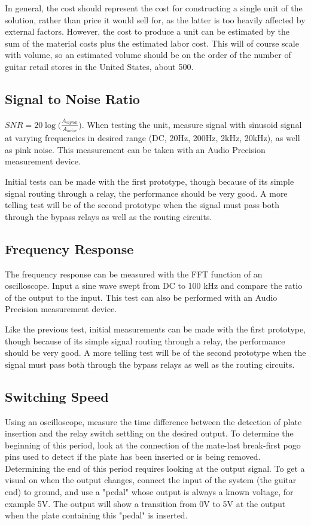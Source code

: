 \documentclass{article}
\begin{document}
	In general, the cost should represent the cost for constructing a single unit of the solution, rather than price it would sell for, as the latter is too heavily affected by external factors.  However, the cost to produce a unit can be estimated by the sum of the material costs plus the estimated labor cost.  This will of course scale with volume, so an estimated volume should be on the order of the number of guitar retail stores in the United States, about 500.

	\subsection{Signal to Noise Ratio}
	$SNR = 20 \log \big( \frac{A_{signal}}{A_{noise}} \big)$.  When testing the unit, measure signal with sinusoid signal at varying frequencies in desired range (DC, 20Hz, 200Hz, 2kHz, 20kHz), as well as pink noise.  This measurement can be taken with an Audio Precision measurement device.

	Initial tests can be made with the first prototype, though because of its simple signal routing through a relay, the performance should be very good.  A more telling test will be of the second prototype when the signal must pass both through the bypass relays as well as the routing circuits.

	\subsection{Frequency Response}
	The frequency response can be measured with the FFT function of an oscilloscope.  Input a sine wave swept from DC to 100 kHz and compare the ratio of the output to the input.  This test can also be performed with an Audio Precision measurement device.

	Like the previous test, initial measurements can be made with the first prototype, though because of its simple signal routing through a relay, the performance should be very good.  A more telling test will be of the second prototype when the signal must pass both through the bypass relays as well as the routing circuits.

	\subsection{Switching Speed}
	Using an oscilloscope, measure the time difference between the detection of plate insertion and the relay switch settling on the desired output.  To determine the beginning of this period, look at the connection of the mate-last break-first pogo pins used to detect if the plate has been inserted or is being removed.  Determining the end of this period requires looking at the output signal.  To get a visual on when the output changes, connect the input of the system (the guitar end) to ground, and use a "pedal" whose output is always a known voltage, for example 5V.  The output will show a transition from 0V to 5V at the output when the plate containing this "pedal" is inserted.
\end{document}
